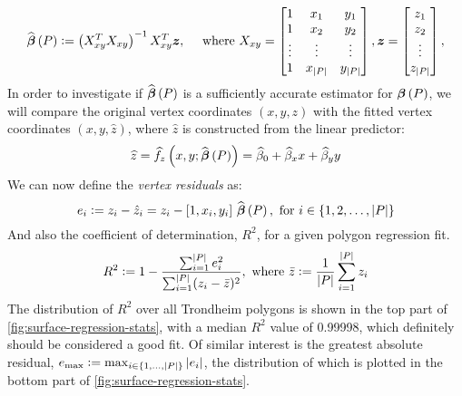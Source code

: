 \begin{align*}
  \widehat{\boldsymbol{\beta}}\left(P\right)
  \vcentcolon=
  \left( X_{xy}^T X_{xy} \right)^{-1} X_{xy}^T \boldsymbol{z},
  \hspace{1em}
  \text{ where }
  X_{xy}
  =
  \begin{bmatrix}
    1 & x_{1} & y_{1} \\
    1 & x_{2} & y_{2} \\
    \vdots & \vdots & \vdots \\
    1 & x_{|P|} & y_{|P|} \\
  \end{bmatrix},
  \boldsymbol{z}
  =
  \begin{bmatrix}
     z_{1} \\
     z_{2} \\
     \vdots \\
     z_{|P|} \\
  \end{bmatrix},
\end{align*}
%
In order to investigate if $\widehat{\boldsymbol{\beta}}\left(P\right)$ is a sufficiently accurate estimator for $\boldsymbol{\beta}\left(P\right)$, we will compare the original vertex coordinates $(x, y, z)$ with the fitted vertex coordinates $(x, y, \hat{z})$, where $\hat{z}$ is constructed from the linear predictor:
\begin{equation*}
  \widehat{z}
  =
  \widehat{f}_z\left(x, y; \widehat{\boldsymbol{\beta}}\left(P\right)\right)
  =
  \widehat{\beta}_{0}
  + \widehat{\beta}_{x} x
  + \widehat{\beta}_{y} y
\end{equation*}
%
We can now define the \textit{vertex residuals} as:
%
\begin{equation*}
  e_i
  \vcentcolon=
  z_i - \hat{z}_i
  =
  z_i - [1, x_i, y_i]~\widehat{\boldsymbol{\beta}}\left(P\right),
  \text{ for } i \in \{1, 2, \ldots, |P|\}
\end{equation*}
%
And also the coefficient of determination, $R^2$, for a given polygon regression fit.
%
\begin{equation*}
  R^2
  \defeq
    1
    -
    \frac{
      \sum_{i = 1}^{|P|} e_i^2
    }{%
    \sum_{i = 1}^{|P|} (z_i - \bar{z})^2
    },
  \text{ where }
  \bar{z} \defeq \frac{1}{|P|} \sum_{i=1}^{|P|} z_i
\end{equation*}
%
The distribution of $R^2$ over all Trondheim polygons is shown in the top part of \cref{fig:surface-regression-stats}, with a median $R^2$ value of 0.99998, which definitely should be considered a good fit.
Of similar interest is the greatest absolute residual, $e_{\mathrm{max}} \vcentcolon= \max_{i \in \{1, \ldots, |P|\}} |e_i|$, the distribution of which is plotted in the bottom part of \cref{fig:surface-regression-stats}.
